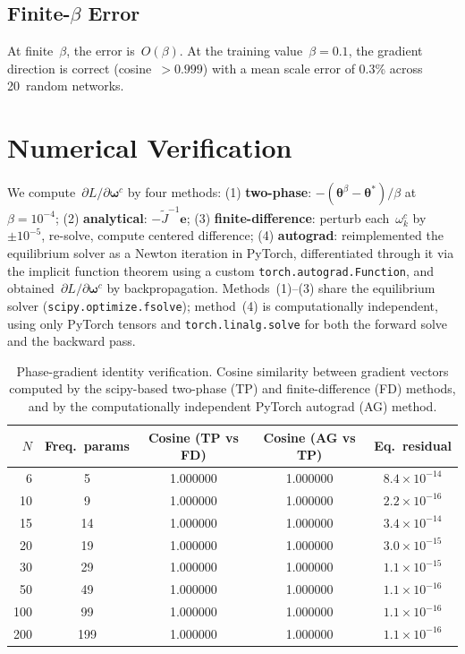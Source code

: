 \documentclass[11pt,a4paper]{article}
\newcommand{\thetastar}{\bm{\theta}^*}
\newcommand{\thetabeta}{\bm{\theta}^\beta}
\newcommand{\bomega}{\bm{\omega}}
\begin{document}
\subsection{Finite-\texorpdfstring{$\beta$}{β} Error}

At finite~$\beta$, the error is~$O(\beta)$. At the training
value~$\beta = 0.1$, the gradient direction is correct (cosine~$> 0.999$)
with a mean scale error of 0.3\% across 20~random networks.

\section{Numerical Verification}
\label{sec:verification}

We compute~$\partial L / \partial \bomega^c$ by four methods: (1)
\textbf{two-phase}: $-(\thetabeta - \thetastar)/\beta$ at
$\beta = 10^{-4}$; (2) \textbf{analytical}: $-\tilde{J}^{-1}\bm{e}$; (3)
\textbf{finite-difference}: perturb each~$\omega_k^c$ by~$\pm 10^{-5}$,
re-solve, compute centered difference; (4) \textbf{autograd}: reimplemented
the equilibrium solver as a Newton iteration in PyTorch, differentiated
through it via the implicit function theorem using a custom
\texttt{torch.autograd.Function}, and obtained~$\partial L / \partial
\bomega^c$ by backpropagation.  Methods~(1)--(3) share the equilibrium
solver (\texttt{scipy.optimize.fsolve}); method~(4) is computationally
independent, using only PyTorch tensors and \texttt{torch.linalg.solve}
for both the forward solve and the backward pass.

\begin{table}[t]
  \centering
  \caption{%
    Phase-gradient identity verification. Cosine similarity between
    gradient vectors computed by the scipy-based two-phase (TP) and
    finite-difference (FD) methods, and by the computationally independent
    PyTorch autograd (AG) method.
  }
  \label{tab:verification}
  \begin{tabular}{@{}rcccc@{}}
    \toprule
    $N$ & Freq.\ params & Cosine (TP vs FD) & Cosine (AG vs TP) & Eq.\ residual \\
    \midrule
    6   & 5   & 1.000000 & 1.000000 & $8.4 \times 10^{-14}$ \\
    10  & 9   & 1.000000 & 1.000000 & $2.2 \times 10^{-16}$ \\
    15  & 14  & 1.000000 & 1.000000 & $3.4 \times 10^{-14}$ \\
    20  & 19  & 1.000000 & 1.000000 & $3.0 \times 10^{-15}$ \\
    30  & 29  & 1.000000 & 1.000000 & $1.1 \times 10^{-15}$ \\
    50  & 49  & 1.000000 & 1.000000 & $1.1 \times 10^{-16}$ \\
    100 & 99  & 1.000000 & 1.000000 & $1.1 \times 10^{-16}$ \\
    200 & 199 & 1.000000 & 1.000000 & $1.1 \times 10^{-16}$ \\
    \bottomrule
  \end{tabular}
\end{table}
\end{document}
